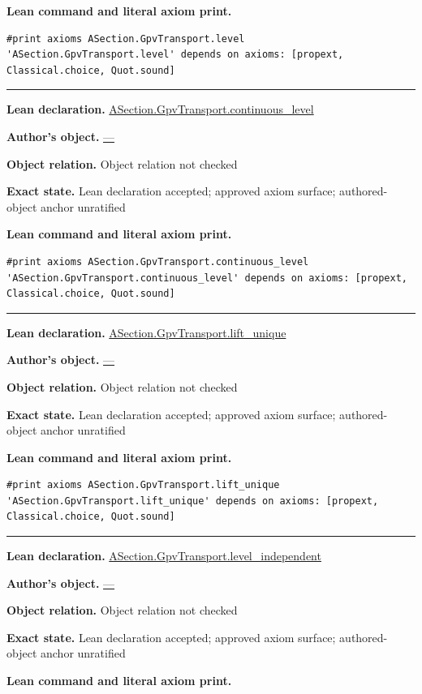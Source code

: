 \documentclass[11pt]{article}
\theoremstyle{plain}
\theoremstyle{definition}
\theoremstyle{remark}
\begin{document}
\begin{tcolorbox}
\par\smallskip\textbf{Lean command and literal axiom print.}
\begin{Verbatim}[breaklines=true,breakanywhere=true,fontsize=\small]
#print axioms ASection.GpvTransport.level
'ASection.GpvTransport.level' depends on axioms: [propext, Classical.choice, Quot.sound]
\end{Verbatim}
\medskip\hrule\medskip
\textbf{Lean declaration.} \url{ASection.GpvTransport.continuous_level}
\par\textbf{Author's object.} \url{—}
\par\textbf{Object relation.} Object relation not checked
\par\textbf{Exact state.} Lean declaration accepted; approved axiom surface; authored-object anchor unratified
\par\smallskip\textbf{Lean command and literal axiom print.}
\begin{Verbatim}[breaklines=true,breakanywhere=true,fontsize=\small]
#print axioms ASection.GpvTransport.continuous_level
'ASection.GpvTransport.continuous_level' depends on axioms: [propext, Classical.choice, Quot.sound]
\end{Verbatim}
\medskip\hrule\medskip
\textbf{Lean declaration.} \url{ASection.GpvTransport.lift_unique}
\par\textbf{Author's object.} \url{—}
\par\textbf{Object relation.} Object relation not checked
\par\textbf{Exact state.} Lean declaration accepted; approved axiom surface; authored-object anchor unratified
\par\smallskip\textbf{Lean command and literal axiom print.}
\begin{Verbatim}[breaklines=true,breakanywhere=true,fontsize=\small]
#print axioms ASection.GpvTransport.lift_unique
'ASection.GpvTransport.lift_unique' depends on axioms: [propext, Classical.choice, Quot.sound]
\end{Verbatim}
\medskip\hrule\medskip
\textbf{Lean declaration.} \url{ASection.GpvTransport.level_independent}
\par\textbf{Author's object.} \url{—}
\par\textbf{Object relation.} Object relation not checked
\par\textbf{Exact state.} Lean declaration accepted; approved axiom surface; authored-object anchor unratified
\par\smallskip\textbf{Lean command and literal axiom print.}
\begin{Verbatim}[breaklines=true,breakanywhere=true,fontsize=\small]

\end{Verbatim}
\end{tcolorbox}
\end{document}
